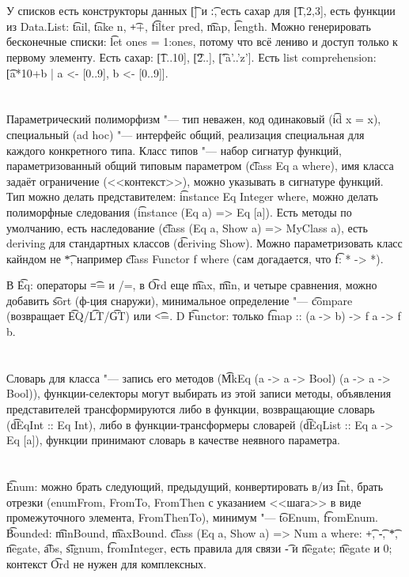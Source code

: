 \section{} %
У списков есть конструкторы данных \t{[]} и \t{:}, есть сахар для \t{[1,2,3]},
есть функции из Data.List: \t{tail}, \t{take n}, \t{++}, \t{filter pred}, \t{map},
\t{length}.
Можно генерировать бесконечные списки: \t{let ones = 1:ones}, потому что всё лениво
и доступ только к первому элементу.
Есть сахар: \t{[1..10]}, \t{[2..]}, \t{['a'..'z']}.
Есть list comprehension: \t{[a*10+b | a <- [0..9], b <- [0..9]]}.

\section{} %
Параметрический полиморфизм "--- тип неважен, код одинаковый (\t{id x = x}),
специальный (ad hoc) "--- интерфейс общий, реализация специальная для каждого конкретного типа.
Класс типов "--- набор сигнатур функций, параметризованный общий типовым параметром (\t{class Eq a where}),
имя класса задаёт ограничение (<<контекст>>), можно указывать в сигнатуре функций.
Тип можно делать представителем: \t{instance Eq Integer where}, можно делать полиморфные следования
(\t{instance (Eq a) => Eq [a]}).
Есть методы по умолчанию, есть наследование (\t{class (Eq a, Show a) => MyClass a}), есть deriving
для стандартных классов (\t{deriving Show}).
Можно параметризовать класс кайндом не \t{*}, например \t{class Functor f where} (сам догадается, что \t{f: * -> *}).

В \t{Eq}: операторы \t{==} и {/=}, в \t{Ord} еще \t{max}, \t{min}, и четыре сравнения, можно добавить \t{sort} (ф-ция снаружи),
минимальное определение "--- \t{compare} (возвращает \t{EQ}/\t{LT}/\t{GT}) или \t{<=}.
D \t{Functor}: только \t{fmap :: (a -> b) -> f a -> f b}.

\section{} %
Словарь для класса "--- запись его методов (\t{MkEq (a -> a -> Bool) (a -> a -> Bool)}),
функции-селекторы могут выбирать из этой записи методы, объявления представителей трансформируются
либо в функции, возвращающие словарь (\t{dEqInt :: Eq Int}), либо в функции-трансформеры словарей (\t{dEqList :: Eq a -> Eq [a]}),
функции принимают словарь в качестве неявного параметра.

\section{} %
\t{Enum}: можно брать следующий, предыдущий, конвертировать в/из \t{Int}, брать отрезки (enumFrom, FromTo, FromThen с указанием <<шага>>
в виде промежуточного элемента, FromThenTo), минимум "--- \t{toEnum}, \t{fromEnum}.
\t{Bounded}: \t{minBound}, \t{maxBound}.
\t{class (Eq a, Show a) => Num a where}: \t{+}, \t{-}, \t{*}, \t{negate}, \t{abs}, \t{signum}, \t{fromInteger},
есть правила для связи \t{-} и \t{negate}; \t{negate} и 0; контекст \t{Ord} не нужен для комплексных.

